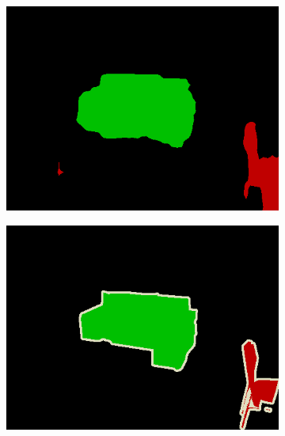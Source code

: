 \documentclass{article} %
\begin{document}
\begin{figure}[t]
\begin{subfigure}[b]{0.19\linewidth}
  \end{subfigure}
  \begin{subfigure}[b]{0.19\linewidth}
    \includegraphics[width=\textwidth]{figs/ab/step8_voc/2007_001457}
  \end{subfigure}
  \begin{subfigure}[b]{0.19\linewidth}
    \includegraphics[width=\textwidth]{figs/ab/gt/2007_001457}
  \end{subfigure}


\end{figure}
\end{document}

